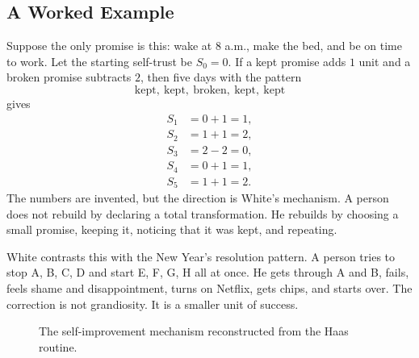 \subsection{A Worked Example}

Suppose the only promise is this: wake at 8 a.m., make the bed, and be on time to work. Let the starting self-trust be \(S_0=0\). If a kept promise adds \(1\) unit and a broken promise subtracts \(2\), then five days with the pattern
\[
\text{kept},\ \text{kept},\ \text{broken},\ \text{kept},\ \text{kept}
\]
gives
\begin{align}
S_1 &= 0+1=1,\\
S_2 &= 1+1=2,\\
S_3 &= 2-2=0,\\
S_4 &= 0+1=1,\\
S_5 &= 1+1=2.
\end{align}
The numbers are invented, but the direction is White's mechanism. A person does not rebuild by declaring a total transformation. He rebuilds by choosing a small promise, keeping it, noticing that it was kept, and repeating.

White contrasts this with the New Year's resolution pattern. A person tries to stop A, B, C, D and start E, F, G, H all at once. He gets through A and B, fails, feels shame and disappointment, turns on Netflix, gets chips, and starts over. The correction is not grandiosity. It is a smaller unit of success.

\begin{figure}
\centering
{}
\caption{The self-improvement mechanism reconstructed from the Haas routine.}
\end{figure}

